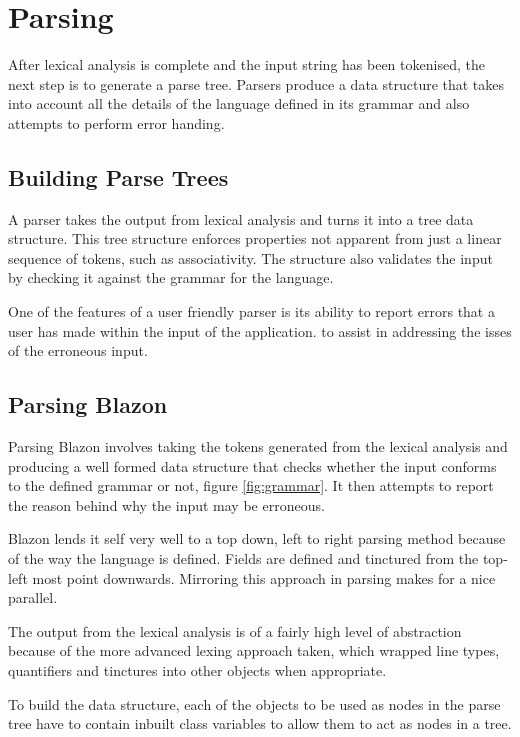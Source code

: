 \chapter{Parsing}

After lexical analysis is complete and the input string has been tokenised, the next step is to generate a parse tree.  Parsers produce a data structure that takes into account all the details of the language defined in its grammar and also attempts to perform error handing.

\section{Building Parse Trees}

A parser takes the output from lexical analysis and turns it into a tree data structure.  This tree structure enforces properties not apparent from just a linear sequence of tokens, such as associativity.  The structure also validates the input by checking it against the grammar for the language.  

One of the features of a user friendly parser is its ability to report errors that a user has made within the input of the application. to assist in addressing the isses of the erroneous input.


\section{Parsing Blazon}

Parsing Blazon involves taking the tokens generated from the lexical analysis and producing a well formed data structure that checks whether the input conforms to the defined grammar or not, figure \ref{fig:grammar}.  It then attempts to report the reason behind why the input may be erroneous.

Blazon lends it self very well to a top down, left to right parsing method because of the way the language is defined. Fields are defined and tinctured from the top-left most point downwards. Mirroring this approach in parsing makes for a nice parallel. 

The output from the lexical analysis is of a fairly high level of abstraction because of the more advanced lexing approach taken, which wrapped line types, quantifiers and tinctures into other objects when appropriate.  

To build the data structure, each of the objects to be used as nodes in the parse tree have to contain inbuilt class variables to allow them to act as nodes in a tree. 

